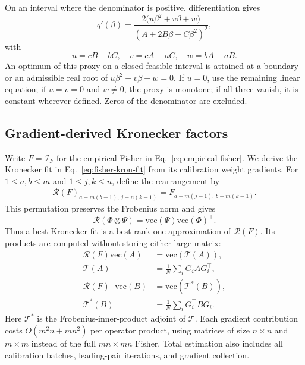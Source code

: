 On an interval where the denominator is positive, differentiation gives
\begin{equation}
q'(\beta)=\frac{2\big(u\beta^2+v\beta+w\big)}{(A+2B\beta+C\beta^2)^2},
\end{equation}
with
\begin{equation}
u=cB-bC,\quad v=cA-aC,\quad w=bA-aB.
\end{equation}
An optimum of this proxy on a closed feasible interval is attained at a boundary or an admissible real root of $u\beta^2+v\beta+w=0$. If $u=0$, use the remaining linear equation; if $u=v=0$ and $w\ne0$, the proxy is monotone; if all three vanish, it is constant wherever defined. Zeros of the denominator are excluded.


\subsection{Gradient-derived Kronecker factors}\label{sup:fisher-estimation}

Write $F=\mathcal I_F$ for the empirical Fisher in Eq.~\eqref{eq:empirical-fisher}. We derive the Kronecker fit in Eq.~\eqref{eq:fisher-kron-fit} from its calibration weight gradients.
For $1\le a,b\le m$ and $1\le j,k\le n$, define the rearrangement by
\begin{equation}
\begin{aligned}
\mathcal R(F)_{a+m(b-1),\,j+n(k-1)}
=F_{a+m(j-1),\,b+m(k-1)}.
\end{aligned}
\end{equation}
This permutation preserves the Frobenius norm and gives
\begin{equation}
\mathcal R(\Phi\otimes\Psi)
=\mathrm{vec}(\Psi)\mathrm{vec}(\Phi)^\top.
\end{equation}
Thus a best Kronecker fit is a best rank-one approximation of $\mathcal R(F)$. Its products are computed without storing either large matrix:
\begin{equation}
\begin{aligned}
\mathcal R(F)\mathrm{vec}(A)&=\mathrm{vec}(\mathcal T(A)),\\
\mathcal T(A)&=\frac1N\sum_iG_iAG_i^\top,\\
\mathcal R(F)^\top\mathrm{vec}(B)&=\mathrm{vec}(\mathcal T^*(B)),\\
\mathcal T^*(B)&=\frac1N\sum_iG_i^\top BG_i.
\end{aligned}
\label{eq:sup-fisher-operators}
\end{equation}
Here $\mathcal T^*$ is the Frobenius-inner-product adjoint of $\mathcal T$. Each gradient contribution costs $O(m^2n+mn^2)$ per operator product, using matrices of size $n\times n$ and $m\times m$ instead of the full $mn\times mn$ Fisher. Total estimation also includes all calibration batches, leading-pair iterations, and gradient collection.

